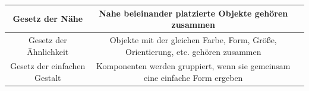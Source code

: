 \documentclass{scrartcl}
\begin{document}
\begin{tabular}{|c|c|c|}
	\hline Gesetz der Nähe & \parbox[c][4cm]{5cm}{Nahe beieinander platzierte Objekte gehören zusammen} &   \\ 
	\hline Gesetz der Ähnlichkeit & \parbox[c][4cm]{5cm}{Objekte mit der gleichen Farbe, Form, Größe, Orientierung, etc. gehören zusammen} &   \\ 
	\hline Gesetz der einfachen Gestalt & \parbox[c][4cm]{5cm}{Komponenten werden gruppiert, wenn sie gemeinsam eine einfache Form ergeben} &   \\ 

\end{tabular}
\end{document}
